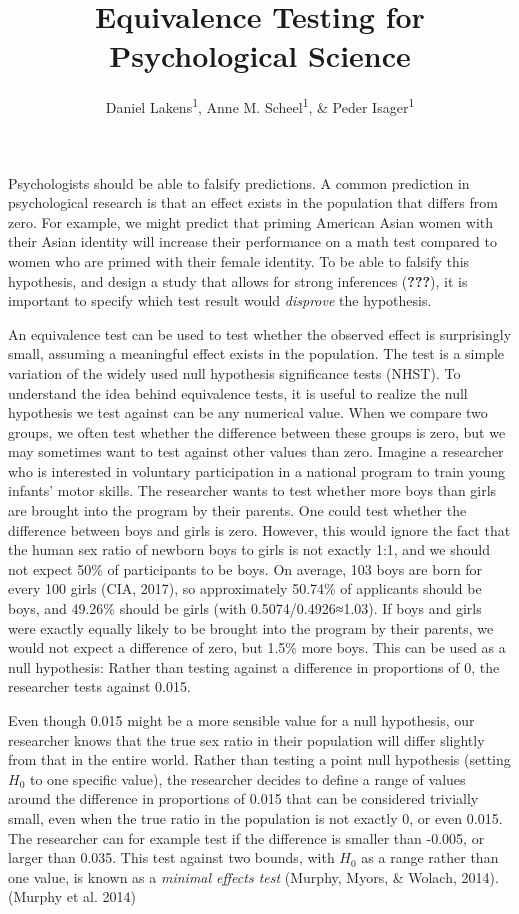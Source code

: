 \documentclass[english,man]{apa6}
\title{Equivalence Testing for Psychological Science}
\author{Daniel Lakens\textsuperscript{1}, Anne M. Scheel\textsuperscript{1}, \& Peder Isager\textsuperscript{1}}
\affiliation{
    \vspace{0.5cm}
          \textsuperscript{1} Eindhoven University of Technology  }
\theoremstyle{definition}
\theoremstyle{definition}
\theoremstyle{definition}
\theoremstyle{remark}
\begin{document}
\maketitle

\setcounter{secnumdepth}{0}



Psychologists should be able to falsify predictions. A common prediction
in psychological research is that an effect exists in the population
that differs from zero. For example, we might predict that priming
American Asian women with their Asian identity will increase their
performance on a math test compared to women who are primed with their
female identity. To be able to falsify this hypothesis, and design a
study that allows for strong inferences ({\textbf{???}}), it is
important to specify which test result would \emph{disprove} the
hypothesis.

An equivalence test can be used to test whether the observed effect is
surprisingly small, assuming a meaningful effect exists in the
population. The test is a simple variation of the widely used null
hypothesis significance tests (NHST). To understand the idea behind
equivalence tests, it is useful to realize the null hypothesis we test
against can be any numerical value. When we compare two groups, we often
test whether the difference between these groups is zero, but we may
sometimes want to test against other values than zero. Imagine a
researcher who is interested in voluntary participation in a national
program to train young infants' motor skills. The researcher wants to
test whether more boys than girls are brought into the program by their
parents. One could test whether the difference between boys and girls is
zero. However, this would ignore the fact that the human sex ratio of
newborn boys to girls is not exactly 1:1, and we should not expect 50\%
of participants to be boys. On average, 103 boys are born for every 100
girls (CIA, 2017), so approximately 50.74\% of applicants should be
boys, and 49.26\% should be girls (with 0.5074/0.4926≈1.03). If boys and
girls were exactly equally likely to be brought into the program by
their parents, we would not expect a difference of zero, but 1.5\% more
boys. This can be used as a null hypothesis: Rather than testing against
a difference in proportions of 0, the researcher tests against 0.015.

Even though 0.015 might be a more sensible value for a null hypothesis,
our researcher knows that the true sex ratio in their population will
differ slightly from that in the entire world. Rather than testing a
point null hypothesis (setting \(H_0\) to one specific value), the
researcher decides to define a range of values around the difference in
proportions of 0.015 that can be considered trivially small, even when
the true ratio in the population is not exactly 0, or even 0.015. The
researcher can for example test if the difference is smaller than
-0.005, or larger than 0.035. This test against two bounds, with \(H_0\)
as a range rather than one value, is known as a \emph{minimal effects
test} (Murphy, Myors, \& Wolach, 2014).(Murphy et al. 2014)
\end{document}
